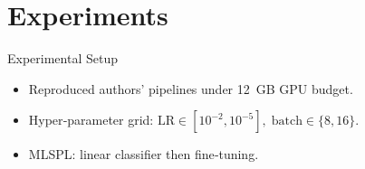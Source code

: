 \section{Experiments}

\begin{frame}{Experimental Setup}
  \begin{itemize}
    \item Reproduced authors’ pipelines under 12 GB GPU budget.
    \item Hyper‑parameter grid: $\text{LR}\in[10^{-2},10^{-5}],\;\text{batch}\in\{8,16\}.$
    \item MLSPL: linear classifier then fine‑tuning.
  \end{itemize}
\end{frame}



